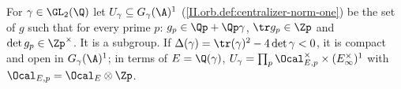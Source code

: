 For $\gamma\in\GL_2(\Q)$ let $U_\gamma\subseteq G_\gamma(\A)^1$ (\cref{II.orb.def:centralizer-norm-one}) be the set of $g$ such that for every prime $p$:
$g_p\in\Qp+\Qp\gamma$, $\tr g_p\in\Zp$ and $\det g_p\in\Zp^\times$. It is a subgroup. If $\Delta(\gamma)=\tr(\gamma)^2-4\det\gamma<0$, it is compact and open in $G_\gamma(\A)^1$;
in terms of $E=\Q(\gamma)$, $U_\gamma=\prod_p\Ocal_{E,p}^\times\times(E_\infty^\times)^1$ with $\Ocal_{E,p}=\Ocal_E\otimes\Zp$.
